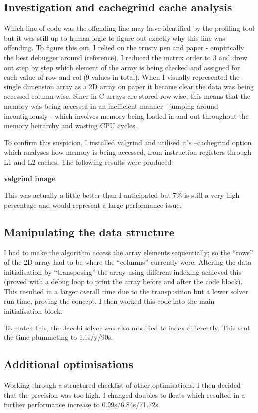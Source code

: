 \documentclass{article}
\begin{document}
\subsection{Investigation and cachegrind cache analysis}
Which line of code was the offending line may have identified by the profiling tool but it was still up to human logic to figure out exactly why this line was offending. To figure this out, I relied on the trusty pen and paper - empirically the best debugger around (reference). I reduced the matrix order to 3 and drew out step by step which element of the array is being checked and assigned for each value of row and col (9 values in total). When I visually represented the single dimension array as a 2D array on paper it became clear the data was being accessed column-wise. Since in C arrays are stored row-wise, this means that the memory was being accessed in an inefficient manner - jumping around incontiguously - which involves memory being loaded in and out throughout the memory heirarchy and wasting CPU cycles.

To confirm this suspicion, I installed valgrind and utilised it's --cachegrind option which analyses how memory is being accessed, from instruction registers through L1 and L2 caches. The following results were produced:

\textbf{valgrind image}

This was actually a little better than I anticipated but 7\% is still a very high percentage and would represent a large performance issue.

\subsection{Manipulating the data structure}
I had to make the algorithm access the array elements sequentially; so the ``rows'' of the 2D array had to be where the ``columns'' currently were. Altering the data initialisation by ``transposing'' the array using different indexing achieved this (proved with a debug loop to print the array before and after the code block). This resulted in a larger overall time due to the transposition but a lower solver run time, proving the concept. I then worked this code into the main initialisation block.

To match this, the Jacobi solver was also modified to index differently. This sent the time plummeting to 1.1s/y/90s.

\subsection{Additional optimisations}
Working through a structured checklist of other optimisations, I then decided that the precision was too high. I changed doubles to floats which resulted in a further performance increase to 0.99s/6.84s/71.72s.
\end{document}
